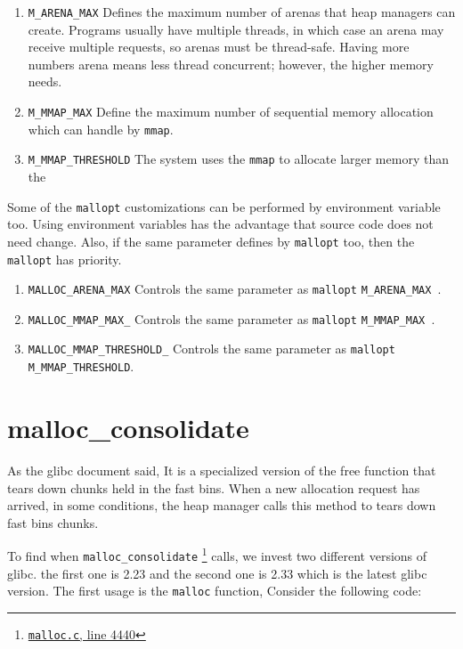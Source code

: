 \documentclass{masterthesis}
\newcommand*\libc{glibc}
\newcommand*\fb{fast bins}
\newcommand*\mallocc{\lstinline{malloc}}
\newcommand*\mmapc{\lstinline{mmap}}
\begin{document}
\begin{enumerate}
\item \lstinline{M_ARENA_MAX} Defines the maximum number of arenas that heap managers can create. Programs usually have multiple threads, in which case an arena may receive multiple requests, so arenas must be thread-safe. Having more numbers arena means less thread concurrent; however, the higher memory needs.

\item \lstinline{M_MMAP_MAX} Define the maximum number of sequential memory allocation which can handle by \mmapc{}.

\item \lstinline{M_MMAP_THRESHOLD} The system uses the \mmapc{} to allocate larger memory than the
\end{enumerate}

Some of the \lstinline{mallopt} customizations can be performed by environment variable too. Using environment variables has the advantage that source code does not need change. Also, if the same parameter defines by \lstinline{mallopt} too, then the \lstinline{mallopt} has priority. 

\begin{enumerate}
\item \lstinline{MALLOC_ARENA_MAX} Controls the same parameter as \lstinline{mallopt} \lstinline{M_ARENA_MAX }.

\item \lstinline{MALLOC_MMAP_MAX_} Controls the same parameter as  \lstinline{mallopt}  \lstinline{M_MMAP_MAX }.

\item \lstinline{MALLOC_MMAP_THRESHOLD_} Controls the same parameter as \lstinline{mallopt} \lstinline{M_MMAP_THRESHOLD}.
\end{enumerate}

\section{malloc\_consolidate}
As the \libc{} document said, It is a specialized version of the free function that tears down chunks held in the \fb{}. When a new allocation request has arrived, in some conditions, the heap manager calls this method to tears down \fb{} chunks.

To find when \lstinline{malloc_consolidate} \footnote{\href{https://sourceware.org/git/?p=glibc.git;a=blob;f=malloc/malloc.c;h=f7cd29bc2f93e1082ee77800bd64a4b2a2897055;hb=9ea3686266dca3f004ba874745a4087a89682617\#l4440}{\texttt{malloc.c}, line 4440}} calls, we invest two different versions of \libc{}. the first one is 2.23 and the second one is 2.33 which is the latest \libc{} version. The first usage is the \mallocc{} function, Consider the following code:
\end{document}
